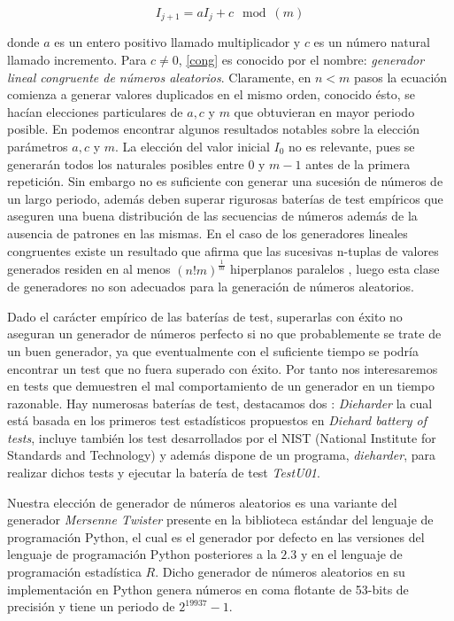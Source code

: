 \documentclass[../proyecto.tex]{memoir}
\begin{document}
\begin{equation} \label{cong}
I_{j+1} = aI_{j} +c \mod (m)
\end{equation}

donde $a$ es un entero positivo llamado multiplicador y $c$ es un número natural llamado incremento. Para $c \neq 0$, \ref{cong} es conocido por el nombre: \textit{generador lineal congruente de números aleatorios}. Claramente, en $n<m$ pasos la ecuación comienza a generar valores duplicados en el mismo orden, conocido ésto, se hacían elecciones particulares de $a,c$ y $m$ que obtuvieran en mayor periodo posible. En \cite{knuth} podemos encontrar algunos resultados notables sobre la elección parámetros $a,c$ y $m$. La elección del valor inicial $I_{0}$ no es relevante, pues se generarán todos los naturales posibles entre $0$ y $m-1$ antes de la primera repetición. Sin embargo no es suficiente con generar una sucesión de números de un largo periodo, además deben superar rigurosas baterías de test empíricos que aseguren una buena distribución de las secuencias de números además de la ausencia de patrones en las mismas. En el caso de los generadores lineales congruentes existe un resultado que afirma que las sucesivas n-tuplas de valores generados residen en al menos $(n!m)^\frac{1}{m}$ hiperplanos paralelos \cite{marsagliaRandom}, luego esta clase de generadores no son adecuados para la generación de números aleatorios.

Dado el carácter empírico de las baterías de test, superarlas con éxito no aseguran un generador de números perfecto si no que probablemente se trate de un buen generador, ya que eventualmente con el suficiente tiempo se podría encontrar un test que no fuera superado con éxito. Por tanto nos interesaremos en tests que demuestren el mal comportamiento de un generador en un tiempo razonable. Hay numerosas baterías de test, destacamos dos \cite{dieharder,testu01}: \textit{Dieharder} la cual está basada en los primeros test estadísticos propuestos en \textit{Diehard battery of tests}, incluye también los test desarrollados por el NIST (National Institute for Standards and Technology) y además dispone de un programa, \textit{dieharder}, para realizar dichos tests y ejecutar la batería de test \textit{TestU01}.

Nuestra elección de generador de números aleatorios es una variante del generador \textit{Mersenne Twister} \cite{mt} presente en la biblioteca estándar del lenguaje de programación Python, el cual es el generador por defecto en las versiones del lenguaje de programación Python posteriores a la $2.3$ \cite{pyver} y en el lenguaje de programación estadística $R$\cite{langR}. Dicho generador de números aleatorios en su implementación en Python genera números en coma flotante de 53-bits de precisión y tiene un periodo de $2^{19937}-1$. 
\end{document}
